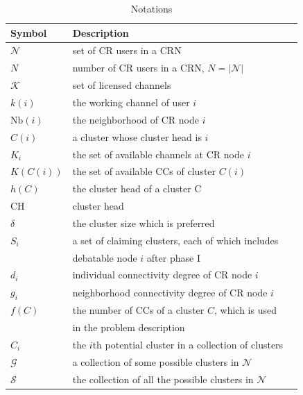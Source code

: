 \documentclass[10pt,journal,compsoc]{IEEEtran}
\theoremstyle{mytheoremstyle}
\theoremstyle{mytheoremstyle}
\theoremstyle{mytheoremstyle}
\begin{document}
\begin{table}[h!]
\caption{Notations}
\label{tab1}
\centering
\begin{tabular}{llr}
\toprule
Symbol & Description \\
\midrule
$\mathcal{N}$  & set of CR users in a CRN\\
$N$ & number of CR users in a CRN, $N=|\mathcal{N}|$\\
$\mathcal{K}$	& set of licensed channels\\
$k(i)$ & the working channel of user $i$\\
$\text{Nb}(i)$ & the neighborhood of CR node $i$    \\
$C(i)$ & a cluster whose cluster head is $i$  \\
$K_i$   & the set of available channels at CR node $i$  \\
$K(C(i))$   & the set of available CCs of cluster $C(i)$ \\
$h(C)$ & the cluster head of a cluster C\\
$\text{CH}$ & cluster head\\
$\delta$ & the cluster size which is preferred\\
$S_i$ & a set of claiming clusters, each of which includes \\
& debatable node $i$ after phase I\\
$d_i$  & individual connectivity degree of CR node $i$\\
$g_i$  & neighborhood connectivity degree of CR node $i$\\
$f(C)$ & the number of CCs of a cluster $C$, which is used \\
& in the problem description\\
$C_i$  & the $i$th potential cluster in a collection of clusters \\
 $\mathcal{G}$ & a collection of some possible clusters in $\mathcal{N}$\\
 $\mathcal{S}$ & the collection of all the possible clusters in $\mathcal{N}$\\
\bottomrule
\end{tabular}
\end{table}
\end{document}
